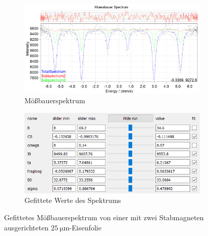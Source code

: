 \documentclass[german, %
parskip=full, %
bibliography=totoc, %
]{scrartcl}
\begin{document}
\begin{figure}[ht]
	\centering
	\begin{subfigure}[b]{0.5\textwidth}
		\includegraphics[width=\textwidth]{MoessbauerEisen25MagnetGerade}
	  \caption{Mößbauerspektrum}
	  \label{fig:moess25gerade}
  \end{subfigure}
  \begin{subfigure}[b]{0.4\textwidth}
	  \includegraphics[width=\textwidth]{WerteEisen25MagnetGerade}
	  \caption{Gefittete Werte des Spektrums}
	  \label{fig:werte25gerade}
  \end{subfigure}
	\caption{Gefittetes Mößbauerspektrum von einer mit zwei Stabmagneten ausgerichteten \(\SI{25}{\micro\meter}\)-Eisenfolie}
	\label{fig:magnetgerade}
\end{figure}
\end{document}
